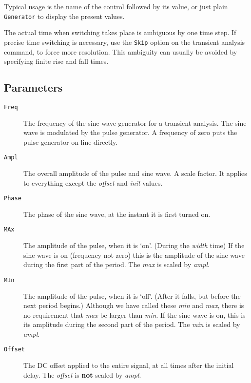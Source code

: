 Typical usage is the name of the control followed by its value, or just plain
{\tt Generator} to display the present values.

The actual time when switching takes place is ambiguous by one time step.  If
precise time switching is necessary, use the {\tt Skip} option on the
transient analysis command, to force more resolution.  This ambiguity can
usually be avoided by specifying finite rise and fall times.
\subsection{Parameters}

\begin{description}

\item[{\tt Freq}] The frequency of the sine wave generator for a transient
analysis.  The sine wave is modulated by the pulse generator.  A frequency
of zero puts the pulse generator on line directly.

\item[{\tt Ampl}] The overall amplitude of the pulse and sine wave.  A
scale factor.  It applies to everything except the {\it offset} and {\it
init} values.

\item[{\tt Phase}] The phase of the sine wave, at the instant it is first
turned on.

\item[{\tt MAx}] The amplitude of the pulse, when it is `on'.  (During the
{\it width} time) If the sine wave is on (frequency not zero) this is the
amplitude of the sine wave during the first part of the period.  The {\it
max} is scaled by {\it ampl}.

\item[{\tt MIn}] The amplitude of the pulse, when it is `off'.  (After it
falls, but before the next period begins.)  Although we have called these
{\it min} and {\it max}, there is no requirement that {\it max} be larger
than {\it min}.  If the sine wave is on, this is its amplitude during the
second part of the period.  The {\it min} is scaled by {\it ampl}.

\item[{\tt Offset}] The DC offset applied to the entire signal, at all times
after the initial delay.  The {\it offset} is {\bf not} scaled by {\it ampl}.


\end{description}
